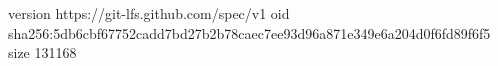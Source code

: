 version https://git-lfs.github.com/spec/v1
oid sha256:5db6cbf67752cadd7bd27b2b78caec7ee93d96a871e349e6a204d0f6fd89f6f5
size 131168
